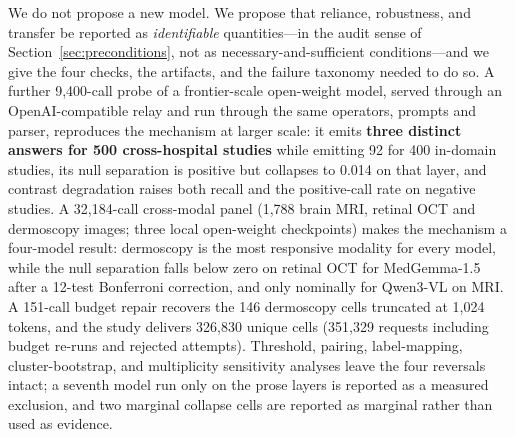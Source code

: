We do not propose a new model. We propose that reliance, robustness, and transfer be reported as \emph{identifiable} quantities---in the audit sense of Section~\ref{sec:preconditions}, not as necessary-and-sufficient conditions---and we give the four checks, the artifacts, and the failure taxonomy needed to do so. A further 9,400-call probe of a frontier-scale open-weight model, served through an OpenAI-compatible relay and run through the same operators, prompts and parser, reproduces the mechanism at larger scale: it emits \textbf{three distinct answers for 500 cross-hospital studies} while emitting 92 for 400 in-domain studies, its null separation is positive but collapses to 0.014 on that layer, and contrast degradation raises both recall and the positive-call rate on negative studies. A 32,184-call cross-modal panel (1,788 brain MRI, retinal OCT and dermoscopy images; three local open-weight checkpoints) makes the mechanism a four-model result: dermoscopy is the most responsive modality for every model, while the null separation falls below zero on retinal OCT for MedGemma-1.5 after a 12-test Bonferroni correction, and only nominally for Qwen3-VL on MRI. A 151-call budget repair recovers the 146 dermoscopy cells truncated at 1,024 tokens, and the study delivers 326,830 unique cells (351,329 requests including budget re-runs and rejected attempts). Threshold, pairing, label-mapping, cluster-bootstrap, and multiplicity sensitivity analyses leave the four reversals intact; a seventh model run only on the prose layers is reported as a measured exclusion, and two marginal collapse cells are reported as marginal rather than used as evidence.
